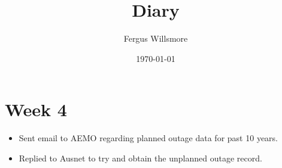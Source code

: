 \documentclass[11pt]{article}
\title{Diary}
\author{Fergus Willsmore}
\date{\today}
\begin{document}
\maketitle
\tableofcontents

\section{Week 4}

\begin{itemize}
\item Sent email to AEMO regarding planned outage data for past 10 years.
\item Replied to Ausnet to try and obtain the unplanned outage record.
\end{itemize}
\end{document}
